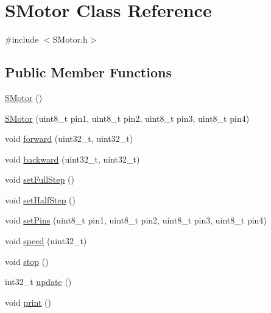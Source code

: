 \hypertarget{class_s_motor}{\section{S\+Motor Class Reference}
\label{class_s_motor}
}


{\ttfamily \#include $<$S\+Motor.\+h$>$}

\subsection*{Public Member Functions}
\begin{DoxyCompactItemize}
\item 
\hyperlink{class_s_motor_a29d1d10288f83e41d200e3623541a351}{S\+Motor} ()
\item 
\hyperlink{class_s_motor_a5a01eb70ccd1c4e82e0cabcd574a0aad}{S\+Motor} (uint8\+\_\+t pin1, uint8\+\_\+t pin2, uint8\+\_\+t pin3, uint8\+\_\+t pin4)
\item 
void \hyperlink{class_s_motor_a70263214c8602defd43293758a0e9765}{forward} (uint32\+\_\+t, uint32\+\_\+t)
\item 
void \hyperlink{class_s_motor_a9d666d613dffcc324e0ae6e1e0a31a3f}{backward} (uint32\+\_\+t, uint32\+\_\+t)
\item 
void \hyperlink{class_s_motor_ab96b926a7df0a17fdc22946f9aa12fde}{set\+Full\+Step} ()
\item 
void \hyperlink{class_s_motor_a1c4101303e66c321fbaf0f7969906910}{set\+Half\+Step} ()
\item 
void \hyperlink{class_s_motor_a9d76c875ebc8686bf6d1bc70aba7b652}{set\+Pins} (uint8\+\_\+t pin1, uint8\+\_\+t pin2, uint8\+\_\+t pin3, uint8\+\_\+t pin4)
\item 
void \hyperlink{class_s_motor_ad4daa775ee1c32bba5673b14961dd17e}{speed} (uint32\+\_\+t)
\item 
void \hyperlink{class_s_motor_afc966d69cfe8f90a0c640e1e24f7b2c6}{stop} ()
\item 
int32\+\_\+t \hyperlink{class_s_motor_a4aee8957f93b071ea7772e5d2c766500}{update} ()
\item 
void \hyperlink{class_s_motor_a70f9d62a3979a923b1e7c90deae30853}{print} ()
\end{DoxyCompactItemize}


